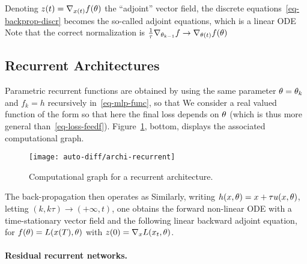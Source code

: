 Denoting $z(t) = \nabla_{x(t)} f(\theta)$ the ``adjoint'' vector field, the discrete equations~\eqref{eq-backprop-discr} becomes the so-called adjoint equations, which is a linear ODE 
Note that the correct normalization is $\frac{1}{\tau} \nabla_{\theta_{k-1}} f  \rightarrow \nabla_{\theta(t)} f(\theta)$

\subsection{Recurrent Architectures}

Parametric recurrent functions are obtained by using the same parameter $\theta=\theta_k$ and $f_k=h$ recursively in~\eqref{eq-mlp-func}, so that 
We consider a real valued function of the form
so that here the final loss depends on $\theta$ (which is thus more general than~\eqref{eq-loss-feedf}).  Figure~\ref{fig-recur}, bottom, displays the associated computational graph.


\begin{figure}
\centering
\texttt{[image: auto-diff/archi-recurrent]}
\caption{\label{fig-recur}
Computational graph for a recurrent architecture.
}
\end{figure}

The back-propagation then operates as 
Similarly, writing $h(x,\theta) = x + \tau u(x,\theta)$, letting $(k,k\tau) \rightarrow (+\infty,t)$, one obtains the forward non-linear ODE with a time-stationary vector field
and the following linear backward adjoint equation, for $f(\theta)=L(x(T),\theta)$
with $z(0) = \nabla_x L(x_t,\theta)$. 

\paragraph{Residual recurrent networks. }

